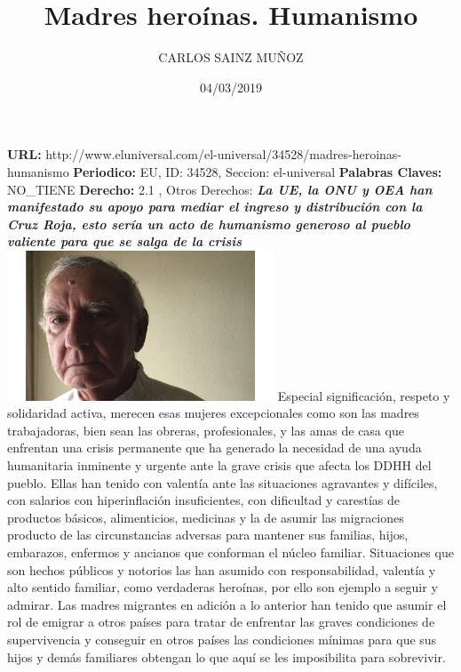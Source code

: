 \documentclass{article}%
\title{\textbf{Madres heroínas. Humanismo}}%
\author{CARLOS SAINZ MUÑOZ}%
\date{04/03/2019}%
\begin{document}
%
\normalsize%
\maketitle%
\textbf{URL: }%
http://www.eluniversal.com/el{-}universal/34528/madres{-}heroinas{-}humanismo\newline%
%
\textbf{Periodico: }%
EU, %
ID: %
34528, %
Seccion: %
el{-}universal\newline%
%
\textbf{Palabras Claves: }%
NO\_TIENE\newline%
%
\textbf{Derecho: }%
2.1%
, Otros Derechos: %
\newline%
%
\textbf{\textit{La UE, la ONU y OEA han manifestado su apoyo para mediar el ingreso y distribución con la Cruz Roja, esto sería un acto de humanismo generoso al pueblo valiente para que se salga de la crisis}}%
\newline%
\newline%
%
\includegraphics[width=300px]{EU_34528.jpg}%
\newline%
%
Especial significación, respeto y solidaridad activa, merecen esas mujeres excepcionales como son las madres trabajadoras, bien sean las obreras, profesionales,  y las amas de casa que  enfrentan una crisis permanente que   ha generado la necesidad de una ayuda humanitaria inminente y urgente ante la grave  crisis que afecta los DDHH del pueblo. Ellas han  tenido   con valentía ante las situaciones agravantes y difíciles, con salarios  con  hiperinflación insuficientes, con dificultad  y carestías de productos básicos, alimenticios, medicinas y la de asumir las migraciones producto  de las   circunstancias adversas para mantener sus familias, hijos, embarazos, enfermos y ancianos  que conforman el núcleo familiar. Situaciones  que son hechos públicos y notorios las han  asumido con responsabilidad, valentía y alto sentido  familiar,   como  verdaderas heroínas, por ello son ejemplo a seguir y admirar.%
\newline%
%
Las madres migrantes en adición a lo anterior   han tenido que asumir   el rol de emigrar a otros países  para tratar de enfrentar las graves condiciones de supervivencia y conseguir en otros países las condiciones mínimas para que sus hijos y demás familiares  obtengan  lo que aquí se les imposibilita para sobrevivir.%
\end{document}
